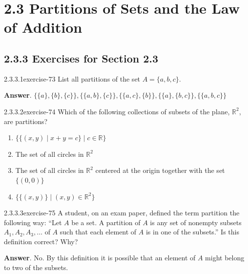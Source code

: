 \documentclass[twoside,10pt,]{book}
\numberwithin{equation}{section}
\begin{document}
\section*{2.3 Partitions of Sets and the Law of Addition}
\subsection*{2.3.3 Exercises for Section 2.3}
\begin{divisionsolution}{2.3.3.1}{}{exercise-73}%
\hypertarget{p-739}{}%
List all partitions of the set \(A =\{a, b, c\}\).%
\par\smallskip%
\noindent\textbf{Answer}.\quad%
\hypertarget{p-740}{}%
\(\{\{a\}, \{b\}, \{c\}\}, \{\{a, b\}, \{c\}\}, \{\{a, c\}, \{b\}\}, \{\{a\}, \{b, c\}\}, \{\{a, b, c\}\}\)%
\end{divisionsolution}%
\begin{divisionsolution}{2.3.3.2}{}{exercise-74}%
\hypertarget{p-741}{}%
Which of the following collections of subsets of the plane, \(\mathbb{R}^2\), are partitions?%
\par
\hypertarget{p-742}{}%
\leavevmode%
\begin{enumerate}[label=(\alph*)]
\item\hypertarget{li-448}{}\hypertarget{p-743}{}%
\(\{ \{(x, y) \mid x + y = c \} \mid c \in \mathbb{R} \}\)%
\item\hypertarget{li-449}{}\hypertarget{p-744}{}%
The set of all circles in \(\mathbb{R}^2 \)%
\item\hypertarget{li-450}{}\hypertarget{p-745}{}%
The set of all circles in \(\mathbb{R}^2\) centered at the origin together with the set \(\{(0,0)\}\)%
\item\hypertarget{li-451}{}\hypertarget{p-746}{}%
\(\{\{(x, y)\} \mid (x, y) \in \mathbb{R}^2  \} \)%
\end{enumerate}
%
\end{divisionsolution}%
\begin{divisionsolution}{2.3.3.3}{}{exercise-75}%
\hypertarget{p-747}{}%
A student, on an exam paper, defined the term partition the following way: ``Let \(A\)  be a set. A partition of \(A\) is any set of nonempty subsets \(A_1, A_2, A_3, \dots\)  of \(A\) such that each element of \(A\) is in one of the subsets.''  Is this definition correct? Why?%
\par\smallskip%
\noindent\textbf{Answer}.\quad%
\hypertarget{p-748}{}%
No. By this definition it is possible that an element of \(A\) might belong to two of the subsets.%
\end{divisionsolution}%
\end{document}
